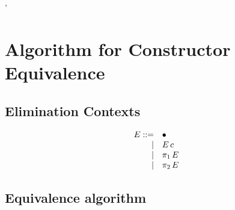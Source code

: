 \documentclass[twoside]{article}
\begin{document}
\infrule
  {
     {}}
  {\equivconstructor{\context}
     {}
     {\constructor}{\kind}}

\infrule
  {
     {}}
  {\equivconstructor{\context}
     {}
     {\constructor'}{}}

\section{Algorithm for Constructor Equivalence}

\subsection{Elimination Contexts}

\newcommand{\hole}{\bullet}

\[
\begin{array}{rll}
E ::= &\hole\\
    |&\capply{E}{\constructor}\\
    |&\cpi{1}{E}\\
    |&\cpi{2}{E}\\
\end{array}
\]

\subsection{Equivalence algorithm}
\end{document}
